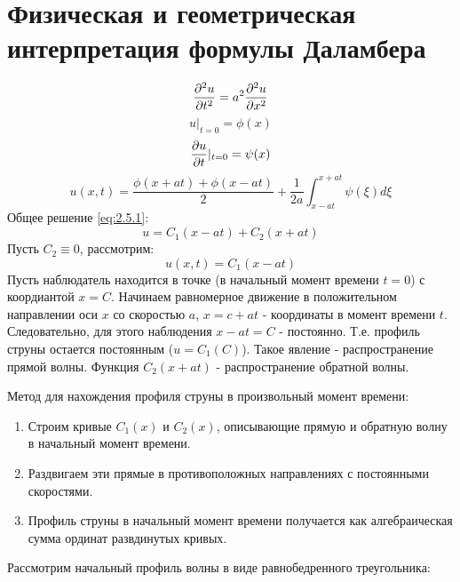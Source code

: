 \documentclass[../main.tex]{subfiles}
\begin{document}
\section{Физическая и геометрическая интерпретация формулы Даламбера}
\begin{equation}
	\label{eq:2.5.1}
	\frac{\partial ^2u}{\partial t^2}=a^2\frac{\partial ^2u}{\partial x^2}
\end{equation}
\begin{equation}
	u|_{t=0} = \phi(x)
\end{equation}
\begin{equation}
	\frac{\partial u}{\partial t}|_{t=0} = \psi(x)
\end{equation}
\begin{equation}
	u(x, t) = \frac{\phi(x + at) + \phi(x - at)}{2} + \frac{1}{2a}\int_{x-at}^{x+at}\psi(\xi)d\xi
\end{equation}
Общее решение \eqref{eq:2.5.1}:
$$
	u = C_1(x-at) + C_2(x+at)
$$
Пусть $C_2 \equiv 0$, рассмотрим:
$$
	u(x, t) = C_1(x - at)
$$
Пусть наблюдатель находится в точке (в начальный момент времени $t = 0$) с коордиантой $x = C$. Начинаем равномерное движение в положительном направлении оси $x$ со скоростью $a$,
$ x = c + at$ - координаты в момент времени $t$. Следовательно, для этого наблюдения $x - at = C$ - постоянно. Т.е. профиль струны остается постоянным ($u = C_1(C)$).
Такое явление - распространение прямой волны. Функция $C_2(x + at)$ - распространение обратной волны.

Метод для нахождения профиля струны в произвольный момент времени:
\begin{enumerate}
	\item Строим кривые $C_1(x)$ и $C_2(x)$, описывающие прямую и обратную волну в начальный момент времени.
	\item Раздвигаем эти прямые в противоположных направлениях с постоянными скоростями.
	\item Профиль струны в начальный момент времени получается как алгебраическая сумма ординат развдинутых кривых.
\end{enumerate}
Рассмотрим начальный профиль волны в виде равнобедренного треугольника:
\end{document}
